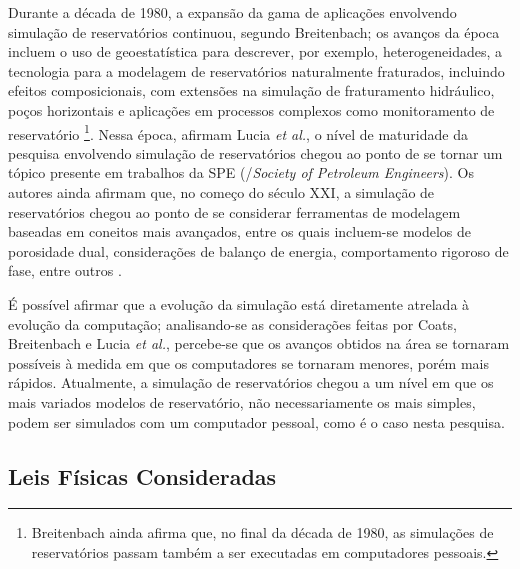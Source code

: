 Durante a d\'{e}cada de 1980, a expans\~{a}o da gama de aplica\c{c}\~{o}es envolvendo simula\c{c}\~{a}o de reservat\'{o}rios continuou, segundo Breitenbach; os avan\c{c}os da \'{e}poca incluem o uso de geoestat\'{i}stica para descrever, por exemplo, heterogeneidades, a tecnologia para a modelagem de reservat\'{o}rios naturalmente fraturados, incluindo efeitos composicionais, com extens\~{o}es na simula\c{c}\~{a}o de fraturamento hidr\'{a}ulico, po\c{c}os horizontais e aplica\c{c}\~{o}es em processos complexos como monitoramento de reservat\'{o}rio \cite{breitenbach1991}\footnote{Breitenbach ainda afirma que, no final da d\'{e}cada de 1980, as simula\c{c}\~{o}es de reservat\'{o}rios passam tamb\'{e}m a ser executadas em computadores pessoais.}. Nessa \'{e}poca, afirmam Lucia \textit{et al.}, o n\'{i}vel de maturidade da pesquisa envolvendo simula\c{c}\~{a}o de reservat\'{o}rios chegou ao ponto de se tornar um t\'{o}pico presente em trabalhos da SPE (/\textit{Society of Petroleum Engineers}). Os autores ainda afirmam que, no come\c{c}o do s\'{e}culo XXI, a simula\c{c}\~{a}o de reservat\'{o}rios chegou ao ponto de se considerar ferramentas de modelagem baseadas em coneitos mais avan\c{c}ados, entre os quais incluem-se modelos de porosidade dual, considera\c{c}\~{o}es de balan\c{c}o de energia, comportamento rigoroso de fase, entre outros  \cite{luciaetal}.

\'{E} poss\'{i}vel afirmar que a evolu\c{c}\~{a}o da simula\c{c}\~{a}o est\'{a} diretamente atrelada \`{a} evolu\c{c}\~{a}o da computa\c{c}\~{a}o; analisando-se as considera\c{c}\~{o}es feitas por Coats, Breitenbach e Lucia \textit{et al.}, percebe-se que os avan\c{c}os obtidos na \'{a}rea se tornaram poss\'{i}veis \`{a} medida em que os computadores se tornaram menores, por\'{e}m mais r\'{a}pidos. Atualmente, a simula\c{c}\~{a}o de reservat\'{o}rios chegou a um n\'{i}vel em que os mais variados modelos de reservat\'{o}rio, n\~{a}o necessariamente os mais simples, podem ser simulados com um computador pessoal, como \'{e} o caso nesta pesquisa.

\subsection{Leis F\'{i}sicas Consideradas}

